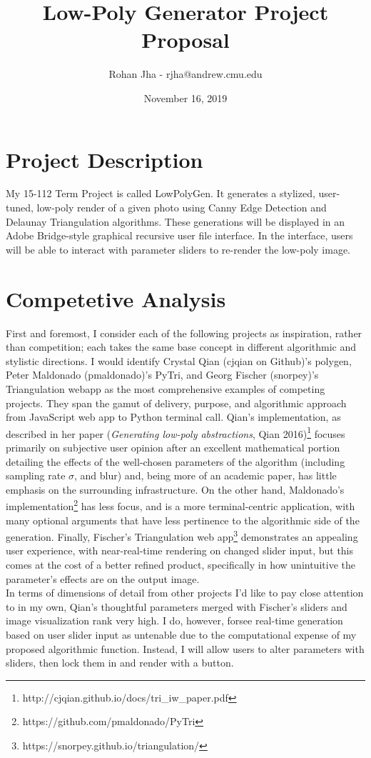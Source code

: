 \documentclass{article}
\title{\textbf{Low-Poly Generator Project Proposal}}
\author{Rohan Jha - rjha@andrew.cmu.edu}
\date{November 16, 2019}
\begin{document}
\maketitle

\section{Project Description}
My 15-112 Term Project is called LowPolyGen. It generates a stylized, user-tuned, low-poly render of a given photo using Canny Edge Detection and Delaunay Triangulation algorithms. These generations will be displayed in an Adobe Bridge-style graphical recursive user file interface. In the interface, users will be able to interact with parameter sliders to re-render the low-poly image.

\section{Competetive Analysis}
First and foremost, I consider each of the following projects as inspiration, rather than competition; each takes the same base concept in different algorithmic and stylistic directions. I would identify Crystal Qian (cjqian on Github)'s polygen, Peter Maldonado (pmaldonado)'s PyTri, and Georg Fischer (snorpey)'s Triangulation webapp as the most comprehensive examples of competing projects. They span the gamut of delivery, purpose, and algorithmic approach from JavaScript web app to Python terminal call. Qian's implementation, as described in her paper (\textit{Generating low-poly abstractions}, Qian 2016)\footnote{http://cjqian.github.io/docs/tri\_iw\_paper.pdf} focuses primarily on subjective user opinion after an excellent mathematical portion detailing the effects of the well-chosen parameters of the algorithm (including sampling rate $\sigma$,  and blur) and, being more of an academic paper, has little emphasis on the surrounding infrastructure. On the other hand, Maldonado's implementation\footnote{https://github.com/pmaldonado/PyTri} has less focus, and is a more terminal-centric application, with many optional arguments that have less pertinence to the algorithmic side of the generation. Finally, Fischer's Triangulation web app\footnote{https://snorpey.github.io/triangulation/} demonstrates an appealing user experience, with near-real-time rendering on changed slider input, but this comes at the cost of a better refined product, specifically in how unintuitive the parameter's effects are on the output image.\\
In terms of dimensions of detail from other projects I'd like to pay close attention to in my own, Qian's thoughtful parameters merged with Fischer's sliders and image visualization rank very high. I do, however, forsee real-time generation based on user slider input as untenable due to the computational expense of my proposed algorithmic function. Instead, I will allow users to alter parameters with sliders, then lock them in and render with a button.
\end{document}
